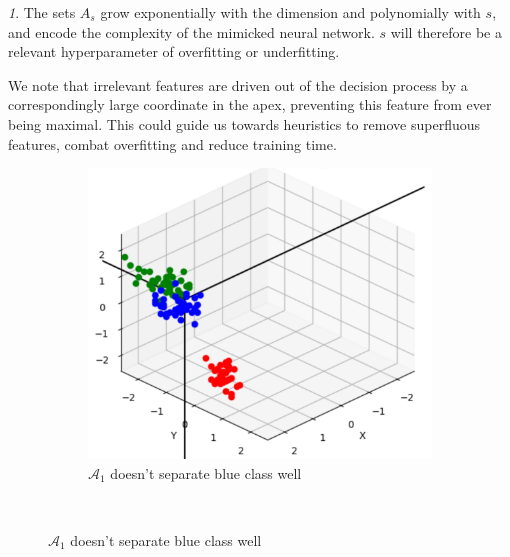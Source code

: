 \documentclass[oneside,english]{amsart}
\numberwithin{equation}{section}
\numberwithin{figure}{section}
\theoremstyle{plain}
\theoremstyle{definition}
\theoremstyle{plain}
\theoremstyle{remark}
\newtheorem{rem}[thm]{\protect\remarkname}
\theoremstyle{plain}
\theoremstyle{definition}
\theoremstyle{definition}
\providecommand{\remarkname}{Remark}
\begin{document}
\begin{rem}
The sets $A_{s}$ grow exponentially with the dimension and polynomially
with $s$, and encode the complexity of the mimicked neural network.
$s$ will therefore be a relevant hyperparameter of overfitting or
underfitting.

We note that irrelevant features are driven out of the decision process
by a correspondingly large coordinate in the apex, preventing this
feature from ever being maximal. This could guide us towards heuristics
to remove superfluous features, combat overfitting and reduce training
time.
\end{rem}

\begin{figure}
    \centering
    \begin{subfigure}{0.8\textwidth}
        \centering
        \includegraphics[width=0.7\linewidth]{fig/veronese_A1.png}
        \caption{$\mathcal{A}_1$ doesn't separate blue class well}
        \label{fig:veronese_A1}
    \end{subfigure}
    \\ %
    

\end{figure}
\end{document}
